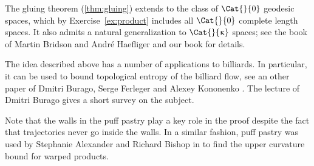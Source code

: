 The gluing theorem (\ref{thm:gluing}) extends to the class of $\Cat{}{0}$ geodesic spaces, 
which by Exercise~\ref{ex:product} includes all $\Cat{}{0}$ complete length spaces.
It also admits a natural generalization to $\Cat{}{\kappa}$ spaces;
see the book of Martin Bridson and  Andr\'e Haefliger \cite{BH} and our book \cite{AKP} for details.

The idea described above has a number of applications to billiards.
In particular, it can be used to bound topological entropy of the billiard flow, see an other paper of Dmitri Burago, Serge Ferleger and Alexey Kononenko \cite{BFK-2}.
The lecture \cite{burago-icm} of Dmitri Burago gives a short survey on the subject.


Note that the walls in the puff pastry play a key role in the proof
despite the fact that trajectories never go inside the walls.
In a similar fashion, puff pastry was used by Stephanie Alexander and Richard Bishop in \cite{a-b:warped}
to find the upper curvature bound for warped products.



